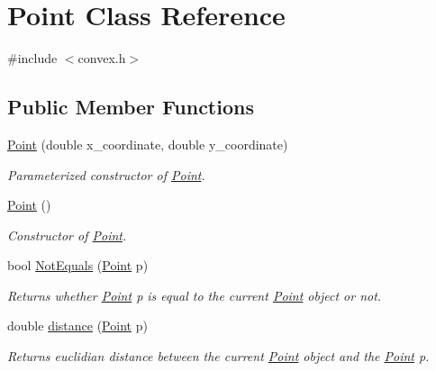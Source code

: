 \hypertarget{classPoint}{}\section{Point Class Reference}
\label{classPoint}


{\ttfamily \#include $<$convex.\+h$>$}

\subsection*{Public Member Functions}
\begin{DoxyCompactItemize}
\item 
\mbox{\label{classPoint_a06beb6b0502802fdca6b18311162a130}} 
\hyperlink{classPoint_a06beb6b0502802fdca6b18311162a130}{Point} (double x\+\_\+coordinate, double y\+\_\+coordinate)
\begin{DoxyCompactList}\small\item\em Parameterized constructor of \hyperlink{classPoint}{Point}. \end{DoxyCompactList}\item 
\mbox{\label{classPoint_ad92f2337b839a94ce97dcdb439b4325a}} 
\hyperlink{classPoint_ad92f2337b839a94ce97dcdb439b4325a}{Point} ()
\begin{DoxyCompactList}\small\item\em Constructor of \hyperlink{classPoint}{Point}. \end{DoxyCompactList}\item 
\mbox{\label{classPoint_a586c0e37a501b824a47a03a077220bbb}} 
bool \hyperlink{classPoint_a586c0e37a501b824a47a03a077220bbb}{Not\+Equals} (\hyperlink{classPoint}{Point} p)
\begin{DoxyCompactList}\small\item\em Returns whether \hyperlink{classPoint}{Point} \textquotesingle{}p\textquotesingle{} is equal to the current \hyperlink{classPoint}{Point} object or not. \end{DoxyCompactList}\item 
\mbox{\label{classPoint_a7dde28996105762fdeba869a0613ce8b}} 
double \hyperlink{classPoint_a7dde28996105762fdeba869a0613ce8b}{distance} (\hyperlink{classPoint}{Point} p)
\begin{DoxyCompactList}\small\item\em Returns euclidian distance between the current \hyperlink{classPoint}{Point} object and the \hyperlink{classPoint}{Point} \textquotesingle{}p\textquotesingle{}. \end{DoxyCompactList}\item 

\end{DoxyCompactItemize}
